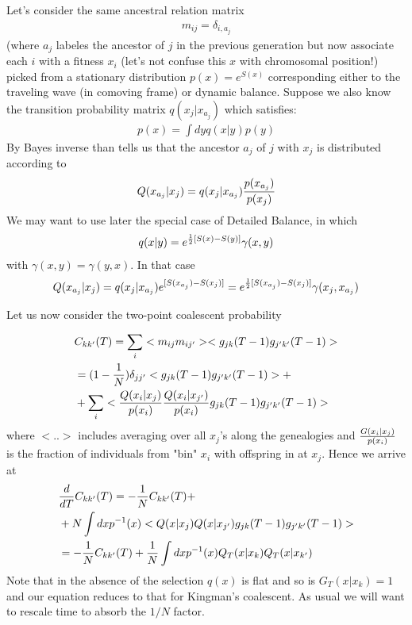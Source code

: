 \documentclass{article}
\begin{document}
Let's consider the same ancestral relation matrix
\begin{eqnarray}
m_{ij}=\delta_{i,a_j}
\end{eqnarray}
(where $a_j$ labeles the ancestor of $j$ in the previous generation
but now associate each $i$ with a fitness $x_i$ (let's not confuse this $x$ with chromosomal position!) picked from a stationary distribution $p(x)=e^{S(x)}$ corresponding either to the traveling wave (in comoving frame) or dynamic balance. Suppose we also know the transition probability matrix $q(x_j |x_{a_j})$ which satisfies:
\begin{eqnarray}
p(x)=\int dy q(x|y)p(y)
\end{eqnarray}
By Bayes inverse than tells us that the ancestor $a_j$ of $j$ with $x_j$ is distributed according to
\begin{eqnarray}
Q(x_{a_j}|x_j)=q(x_j|x_{a_j}){p(x_{a_j}) \over p(x_{j})}
\end{eqnarray}
We may want to use later the special case of Detailed Balance, in which
\begin{eqnarray}
q(x|y)=e^{{1 \over 2}[S(x)-S(y)]} \gamma(x,y)
\end{eqnarray}
with $\gamma(x,y)=\gamma(y,x)$. In that case
\begin{eqnarray}
Q(x_{a_j}|x_j)=q(x_j|x_{a_j})e^{ [S(x_{a_j})-S(x_{j})]}=e^{{1 \over 2} [S(x_{a_j})-S(x_{j})]}\gamma(x_j,x_{a_j})
\end{eqnarray}

Let us now consider the two-point coalescent probability

\begin{eqnarray}
&C_{kk'}(T)=\sum_i <m_{ij}m_{ij'}><g_{jk}(T-1)g_{j'k'}(T-1)>\\
&=(1- {1 \over N})\delta_{jj'} <g_{jk}(T-1)g_{j'k'}(T-1)>+\\
&+\sum_i  <{Q(x_{i}|x_j)\over p(x_i)}{Q(x_i|x_{j'}) \over p(x_i)} g_{jk}(T-1)g_{j'k'}(T-1)>\\
\end{eqnarray}
where $<..>$ includes averaging over all $x_j$'s along the genealogies and $G(x_{i}|x_j)\over p(x_i)$ is the fraction of individuals from
"bin" $x_i$ with offspring in at $x_j$. Hence we arrive at
\begin{eqnarray}
&{d \over dT} C_{kk'}(T)=- {1 \over N} C_{kk'}(T)+\\
&+N \int dx p^{-1} (x) <{Q(x|x_j)Q(x|x_{j'}) } g_{jk}(T-1)g_{j'k'}(T-1)>\\
&=- {1 \over N} C_{kk'}(T)+{1 \over N} \int dx p^{-1} (x) {Q_T(x|x_k)Q_T(x|x_{k'}) } 
\end{eqnarray}
Note that in the absence of the selection $q(x)$ is flat and so is $G_T(x|x_k)=1$ and our equation reduces to that for Kingman's coalescent. As usual we will want to rescale time to absorb the $1/N$ factor.
\end{document}
